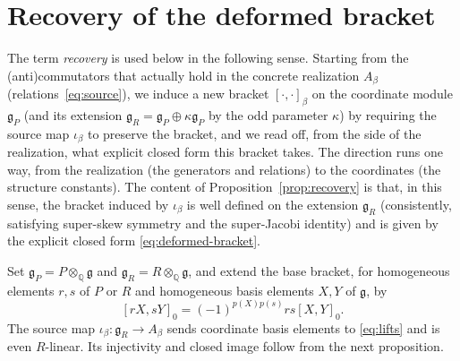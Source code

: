 \documentclass[11pt]{article}
\numberwithin{equation}{section}
\theoremstyle{remark}
\begin{document}
\section{Recovery of the deformed bracket}\label{sec:recovery}

The term \emph{recovery} is used below in the following sense. Starting from
the (anti)commutators that actually hold in the concrete realization
$A_\beta$ (relations~\eqref{eq:source}), we induce a
new bracket $[\cdot,\cdot]_\beta$ on the coordinate module $\mathfrak g_P$
(and its extension $\mathfrak g_R=\mathfrak g_P\oplus\kappa\mathfrak g_P$ by
the odd parameter $\kappa$) by requiring the source map $\iota_\beta$ to
preserve the bracket, and we read off, from the side of the realization, what
explicit closed form this bracket takes. The direction runs one way, from the
realization (the generators and relations) to the coordinates (the structure
constants). The content of
Proposition~\ref{prop:recovery} is that, in this sense, the bracket induced by
$\iota_\beta$ is well defined on the extension $\mathfrak g_R$
(consistently, satisfying super-skew symmetry and the super-Jacobi identity)
and is given by the explicit closed form \eqref{eq:deformed-bracket}.

Set $\mathfrak g_P=P\otimes_{\mathbb Q}\mathfrak g$ and
$\mathfrak g_R=R\otimes_{\mathbb Q}\mathfrak g$, and extend the base bracket, for
homogeneous elements $r,s$ of $P$ or $R$ and homogeneous basis elements
$X,Y$ of $\mathfrak g$, by
\begin{equation}\label{eq:scalar-rule}
 [rX,sY]_0=(-1)^{p(X)p(s)}rs[X,Y]_0.
\end{equation}
The source map $\iota_\beta:\mathfrak g_R\to A_\beta$ sends coordinate basis
elements to \eqref{eq:lifts} and is even $R$-linear. Its injectivity and
closed image follow from the next proposition.
\end{document}
